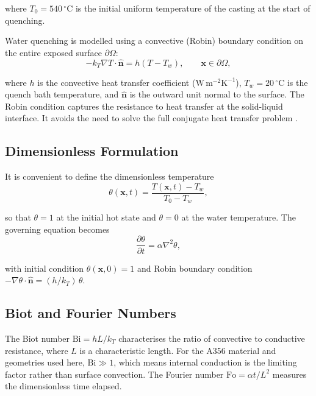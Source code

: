 where $T_0 = 540\,^\circ\mathrm{C}$ is the initial uniform temperature of
the casting at the start of quenching.

Water quenching is modelled using a convective (Robin) boundary condition on
the entire exposed surface $\partial\Omega$:
\begin{equation}
-k_T \nabla T \cdot \hat{\mathbf{n}} = h(T - T_w),
\qquad \mathbf{x}\in\partial\Omega,
\label{eq:robin}
\end{equation}

where $h$ is the convective heat transfer coefficient
($\mathrm{W\,m^{-2}K^{-1}}$), $T_w = 20\,^\circ\mathrm{C}$ is the quench
bath temperature, and $\hat{\mathbf{n}}$ is the outward unit normal to the
surface.
The Robin condition captures the resistance to heat transfer at the
solid-liquid interface.
It avoids the need to solve the full conjugate heat transfer problem
\cite{wilson1966,xiao2010}.

\subsection{Dimensionless Formulation}

It is convenient to define the dimensionless temperature
\begin{equation}
\theta(\mathbf{x},t) = \frac{T(\mathbf{x},t) - T_w}{T_0 - T_w},
\label{eq:theta}
\end{equation}

so that $\theta=1$ at the initial hot state and $\theta=0$ at the water
temperature.
The governing equation becomes
\begin{equation}
\frac{\partial\theta}{\partial t} = \alpha\nabla^2\theta,
\label{eq:heat_dim}
\end{equation}

with initial condition $\theta(\mathbf{x},0)=1$ and Robin boundary condition
$-\nabla\theta\cdot\hat{\mathbf{n}} = (h/k_T)\,\theta$.

\subsection{Biot and Fourier Numbers}

The Biot number $\mathrm{Bi} = hL/k_T$ characterises the ratio of convective
to conductive resistance, where $L$ is a characteristic length.
For the A356 material and geometries used here, $\mathrm{Bi}\gg1$, which means
internal conduction is the limiting factor rather than surface convection.
The Fourier number $\mathrm{Fo} = \alpha t/L^2$ measures the dimensionless
time elapsed.

